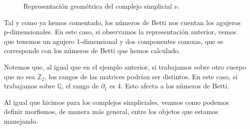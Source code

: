 \documentclass[12pt, a4paper, twoside]{book}
\numberwithin{equation}{section}
\theoremstyle{definition}
\newenvironment{ejem}
  {\pushQED{\qed}\renewcommand{\qedsymbol}{$\blacktriangleleft$}\ejemplo}
  {\popQED\endejemplo}
\theoremstyle{remark}
\theoremstyle{plain}
\begin{document}
\begin{ejem}
\begin{figure}[H]
			\caption{Representación geométrica del complejo simplicial {\Large $\nu$}.}
			\label{fig:homs}
		\end{figure}
		Tal y como ya hemos comentado, los números de Betti nos 
		cuentan los agujeros p-dimensionales. En este caso, si 
		observamos la representación anterior, vemos que tenemos un 
		agujero 1-dimensional y dos componentes conexas, que se 
		corresponde con los números de Betti que hemos calculado. 

		Notemos que, al igual que en el ejemplo anterior, si 
		trabajamos sobre otro cuerpo que no sea $\mathbb{Z}_{2}$, los 
		rangos de las matrices podrían ser distintos. En este caso, si
		trabajamos sobre $\mathbb{Q}$, el rango de $\partial_{1}$ es 
		4. Esto afecta a los números de Betti. 
	\end{ejem}
	
	Al igual que hicimos para los complejos simpliciales, veamos como 
	podemos definir morfismos, de manera más general, entre los objetos 
	que estamos manejando.
	
\end{document}
